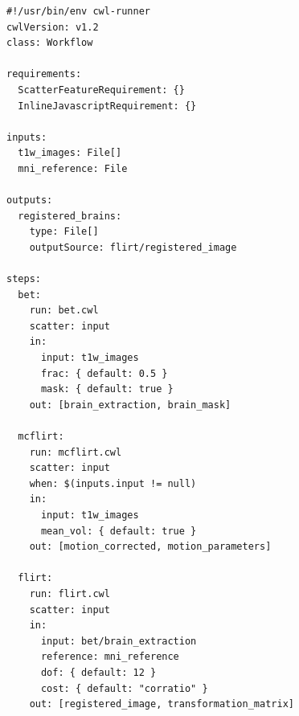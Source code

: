 \documentclass[border=5pt]{standalone}
\begin{document}
\begin{mdframed}[
  backgroundcolor=codebg,
  linecolor=frame,
  linewidth=0.5pt,
  roundcorner=3pt,
  innerleftmargin=8pt,
  innertopmargin=8pt,
  innerbottommargin=8pt
]
\begin{verbatim}
#!/usr/bin/env cwl-runner
cwlVersion: v1.2
class: Workflow

requirements:
  ScatterFeatureRequirement: {}
  InlineJavascriptRequirement: {}

inputs:
  t1w_images: File[]
  mni_reference: File

outputs:
  registered_brains:
    type: File[]
    outputSource: flirt/registered_image

steps:
  bet:
    run: bet.cwl
    scatter: input
    in:
      input: t1w_images
      frac: { default: 0.5 }
      mask: { default: true }
    out: [brain_extraction, brain_mask]

  mcflirt:
    run: mcflirt.cwl
    scatter: input
    when: $(inputs.input != null)
    in:
      input: t1w_images
      mean_vol: { default: true }
    out: [motion_corrected, motion_parameters]

  flirt:
    run: flirt.cwl
    scatter: input
    in:
      input: bet/brain_extraction
      reference: mni_reference
      dof: { default: 12 }
      cost: { default: "corratio" }
    out: [registered_image, transformation_matrix]
\end{verbatim}
\end{mdframed}
\end{document}
